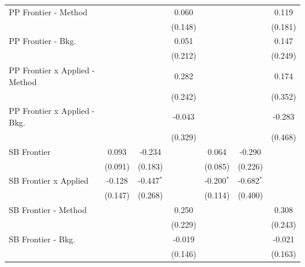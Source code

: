 \begin{tabular}{lcccccc}
   PP Frontier - Method           &              &              & 0.060         &              &              & 0.119\\   
                                  &              &              & (0.148)       &              &              & (0.181)\\   
   PP Frontier - Bkg.             &              &              & 0.051         &              &              & 0.147\\   
                                  &              &              & (0.212)       &              &              & (0.249)\\   
   PP Frontier x Applied - Method &              &              & 0.282         &              &              & 0.174\\   
                                  &              &              & (0.242)       &              &              & (0.352)\\   
   PP Frontier x Applied - Bkg.   &              &              & -0.043        &              &              & -0.283\\   
                                  &              &              & (0.329)       &              &              & (0.468)\\   
   SB Frontier                    & 0.093        & -0.234       &               & 0.064        & -0.290       &   \\   
                                  & (0.091)      & (0.183)      &               & (0.085)      & (0.226)      &   \\   
   SB Frontier x Applied          & -0.128       & -0.447$^{*}$ &               & -0.200$^{*}$ & -0.682$^{*}$ &   \\   
                                  & (0.147)      & (0.268)      &               & (0.114)      & (0.400)      &   \\   
   SB Frontier - Method           &              &              & 0.250         &              &              & 0.308\\   
                                  &              &              & (0.229)       &              &              & (0.243)\\   
   SB Frontier - Bkg.             &              &              & -0.019        &              &              & -0.021\\   
                                  &              &              & (0.146)       &              &              & (0.163)\\   

\end{tabular}
